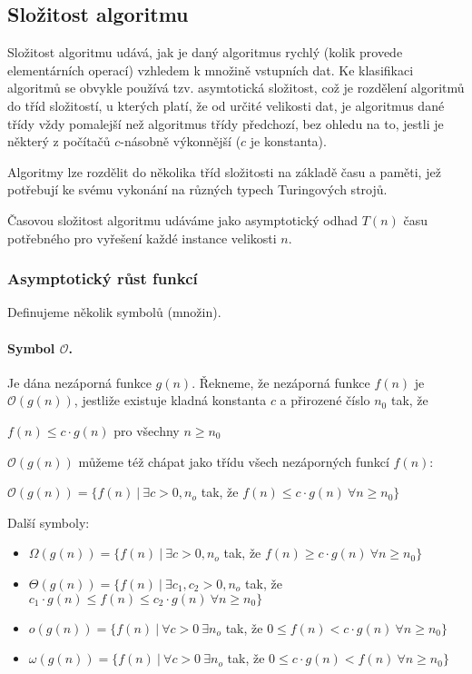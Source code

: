 \subsection{Složitost algoritmu}
Složitost algoritmu udává, jak je daný algoritmus rychlý (kolik provede elementárních operací) vzhledem k množině vstupních dat. Ke klasifikaci algoritmů se obvykle používá tzv. asymtotická složitost, což je rozdělení algoritmů do tříd složitostí, u kterých platí, že od určité velikosti dat, je algoritmus dané třídy vždy pomalejší než algoritmus třídy předchozí, bez ohledu na to, jestli je některý z počítačů $c$-násobně výkonnější ($c$ je konstanta).

Algoritmy lze rozdělit do několika tříd složitosti na základě času a paměti, jež potřebují ke svému vykonání na různých typech Turingových strojů. \cite{algoritmy:slozitosti}

Časovou složitost algoritmu udáváme jako asymptotický odhad $T(n)$ času potřebného pro vyřešení každé instance velikosti $n$.

\subsubsection{Asymptotický růst funkcí} Definujeme několik symbolů (množin).

\paragraph{Symbol $\mathcal{O}$.} Je dána nezáporná funkce $g(n)$. Řekneme, že nezáporná funkce $f(n)$ je $\mathcal{O}(g(n))$, jestliže existuje kladná konstanta $c$ a přirozené číslo $n_0$ tak, že

\begin{center}
    $f(n) \leq c \cdot g(n)$ pro všechny $n \geq n_0$
\end{center}

$\mathcal{O}(g(n))$ můžeme též chápat jako třídu všech nezáporných funkcí $f(n)$:

\begin{center}
    $\mathcal{O}(g(n)) = \{ f(n)~|~\exists c > 0, n_o$ tak, že $f(n) \leq c \cdot g(n) ~ \forall n \geq n_0\}$
\end{center}
\noindent Další symboly:
\begin{itemize}[itemsep=0pt]
    \item $\Omega(g(n)) = \{ f(n)~|~\exists c > 0 ,n_o$ tak, že $f(n) \geq c \cdot g(n) ~ \forall n \geq n_0\}$
    \item $\Theta(g(n)) = \{ f(n)~|~\exists c_1,c_2 > 0 ,n_o$ tak, že $c_1 \cdot g(n) \leq f(n) \leq c_2 \cdot g(n) ~ \forall n \geq n_0\}$
    \item $o(g(n)) = \{ f(n)~|~\forall c > 0 ~\exists n_o$ tak, že $ 0 \leq f(n) < c \cdot g(n) ~ \forall n \geq n_0\}$
    \item $\omega(g(n)) = \{ f(n)~|~\forall c > 0 ~\exists n_o$ tak, že $ 0 \leq c \cdot g(n) < f(n) ~ \forall n \geq n_0\}$
\end{itemize}

